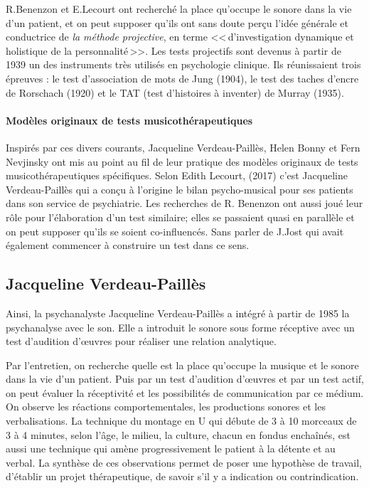  	 
        R.Benenzon et E.Lecourt ont  recherché la place qu'occupe le sonore dans la vie d'un 
        patient, et on peut supposer qu'ils ont sans doute perçu l'idée générale et 
        conductrice de \emph{la méthode projective}, 
        en terme 
	    <<\,d'investigation dynamique et holistique de la
        personnalité\,>>. Les tests projectifs sont devenus à partir
        de 1939 un des instruments très utilisés en psychologie
        clinique. Ils réunissaient trois épreuves : le test
        d'association de mots de Jung (1904), le test des taches
        d'encre de Rorschach (1920) et le TAT (test d'histoires à
        inventer) de Murray (1935)\autocite[ch.~1, p.~13]{anzieu.chabert:methodes}.
		

	
\paragraph{Modèles originaux de tests musicothérapeutiques}

Inspirés par ces divers courants, Jacqueline Verdeau-Paillès, Helen Bonny et Fern Nevjinsky ont mis au point au fil de leur
pratique des modèles originaux de tests musicothérapeutiques
spécifiques. Selon Edith Lecourt,
(2017)\autocite[ch.~3, p.~84]{Les arts-thérapies,Ed.Armand-Colin}
c'est Jacqueline Verdeau-Paillès qui a conçu à
l'origine le bilan psycho-musical pour ses patients dans son service
de psychiatrie. Les recherches de R.
Benenzon ont aussi joué leur rôle \autocite{benenzon:musicotherapie}  pour l'élaboration d'un
test similaire; elles se passaient quasi en
parallèle et on peut supposer qu'ils se soient co-influencés. Sans
parler de J.Jost qui avait également commencer à construire un test dans ce sens.




\subsection{Jacqueline Verdeau-Paillès}

 Ainsi, la psychanalyste Jacqueline Verdeau-Paillès a 
intégré à partir de 1985 la psychanalyse avec le son. Elle a  introduit
 le sonore 
sous forme réceptive avec un test d'audition d'\oe uvres pour réaliser
une relation analytique\autocite{verdeau-pailles:bilan}.

Par l'entretien, on recherche quelle est la place qu'occupe la
musique et le sonore dans la vie d'un patient. Puis par un test
d'audition d'\oe uvres et par un test actif, on peut évaluer la
réceptivité et les possibilités de communication par ce médium. On
observe les réactions comportementales, les productions sonores et les
verbalisations. La technique du montage en U qui débute de 3 à 10
morceaux de 3 à 4 minutes, selon l'âge, le milieu, la culture, chacun
en fondus enchaînés, est aussi une technique qui amène progressivement le patient à la détente
et au verbal.
La synthèse de ces observations permet de poser une hypothèse de
travail, d'établir un projet thérapeutique, de savoir s'il y a
indication ou contrindication.





